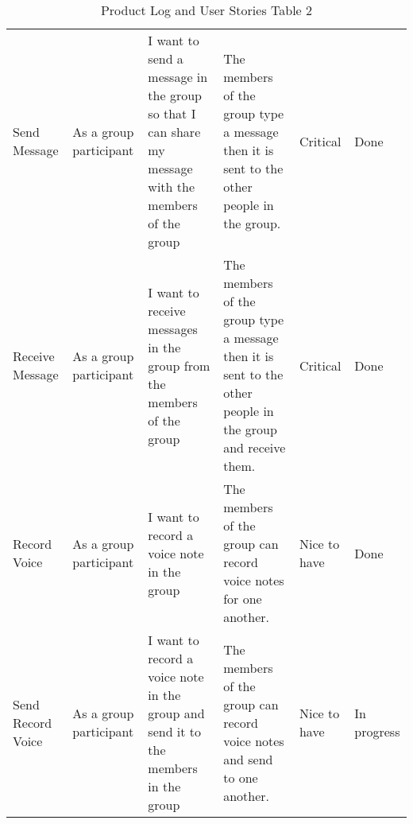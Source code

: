 \documentclass[a4paper]{article}
\begin{document}
\begin{table}[H]
\begin{tabular}{p{1.5cm} p{2.5cm} p{3cm} p{3cm} p{1cm} p{1cm}}
Send Message & As a group participant & I want to send a message in the group so that I can share my message with the members of the group & The members of the group type a message then it is sent to the other people in the group. & Critical & Done\\ \cmidrule(l){2-6} %

Receive Message & As a group participant & I want to receive messages in the group from the members of the group & The members of the group type a message then it is sent to the other people in the group and receive them. & Critical & Done\\ \cmidrule(l){2-6} %

Record Voice & As a group participant & I want to record a voice note in the group & The members of the group can record voice notes for one another. & Nice to have & Done\\ \cmidrule(l){2-6}%

Send Record Voice & As a group participant & I want to record a voice note in the group and send it to the members in the group & The members of the group can record voice notes and send to one another. & Nice to have & In progress\\  %


\midrule %
\midrule %
\end{tabular}
\caption{Product Log and User Stories Table 2} %
\label{tab:template} %
\end{table}

\vfill
\clearpage
\end{document}
